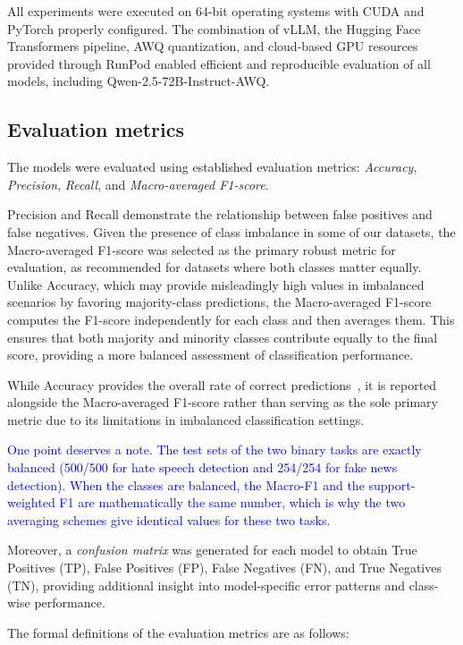 \documentclass[10pt,letterpaper]{article}
\newcommand{\rev}[1]{\textcolor{blue}{#1}}
\begin{document}
All experiments were executed on 64-bit operating systems with CUDA and PyTorch properly configured. The combination of vLLM, the Hugging Face Transformers pipeline, AWQ quantization, and cloud-based GPU resources provided through RunPod enabled efficient and reproducible evaluation of all models, including Qwen-2.5-72B-Instruct-AWQ.




\subsection*{Evaluation metrics}
\label{sec:evaluation_metrics}
The models were evaluated using established evaluation metrics: \textit{Accuracy}, \textit{Precision}, \textit{Recall}, and \textit{Macro-averaged F1-score}. 

Precision and Recall demonstrate the relationship between false positives and false negatives. Given the presence of class imbalance in some of our datasets, the Macro-averaged F1-score was selected as the primary robust metric for evaluation, as recommended for datasets where both classes matter equally. Unlike Accuracy, which may provide misleadingly high values in imbalanced scenarios by favoring majority-class predictions, the Macro-averaged F1-score computes the F1-score independently for each class and then averages them. This ensures that both majority and minority classes contribute equally to the final score, providing a more balanced assessment of classification performance.

While Accuracy provides the overall rate of correct predictions~\cite{b44}, it is reported alongside the Macro-averaged F1-score rather than serving as the sole primary metric due to its limitations in imbalanced classification settings.

\rev{One point deserves a note. The test sets of the two binary tasks are exactly balanced (500/500 for hate speech detection and 254/254 for fake news detection). When the classes are balanced, the Macro-F1 and the support-weighted F1 are mathematically the same number, which is why the two averaging schemes give identical values for these two tasks.}

Moreover, a \textit{confusion matrix} was generated for each model to obtain True Positives (TP), False Positives (FP), False Negatives (FN), and True Negatives (TN), providing additional insight into model-specific error patterns and class-wise performance.

The formal definitions of the evaluation metrics are as follows:
\end{document}
